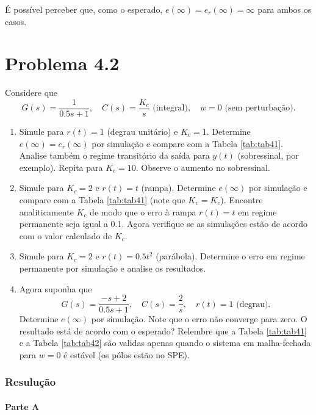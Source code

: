 \documentclass[
]{book}
\providecommand{\tightlist}{%
  \setlength{\itemsep}{0pt}\setlength{\parskip}{0pt}}
\theoremstyle{definition}
\theoremstyle{definition}
\theoremstyle{definition}
\theoremstyle{remark}
\begin{document}
É possível perceber que, como o esperado, \(e(\infty)= e_r(\infty) = \infty\) para ambos os casos.

\hypertarget{problema-4.2}{%
\section*{Problema 4.2}\label{problema-4.2}}

Considere que
\[
G(s) = \frac {1}{0.5s+1}, \quad C(s) = \frac{K_c}{s} \text{ (integral)}, \quad w=0 \text{ (sem perturbação).}
\]

\begin{enumerate}
\def\labelenumi{\alph{enumi}.}
\tightlist
\item
  Simule para \(r(t) = 1\) (degrau unitário) e \(K_c = 1\). Determine \(e(\infty) = e_r(\infty)\) por simulação e compare com a Tabela \ref{tab:tab41}. Analise também o regime transitório da saída para \(y(t)\) (sobressinal, por exemplo). Repita para \(K_c = 10\). Observe o aumento no sobressinal.
\item
  Simule para \(K_c = 2\) e \(r(t) = t\) (rampa). Determine \(e(\infty)\) por simulação e compare com a Tabela \ref{tab:tab41} (note que \(K_v = K_c\)). Encontre analiticamente \(K_c\) de modo que o erro à rampa \(r(t) = t\) em regime permanente seja igual a 0.1. Agora verifique se as simulações estão de acordo com o valor calculado de \(K_c\).
\item
  Simule para \(K_c = 2\) e \(r(t) = 0.5t^2\) (parábola). Determine o erro em regime permanente por simulação e analise os resultados.
\item
  Agora suponha que
  \[
  G(s) = \frac {-s+2}{0.5s+1}, \quad C(s)= \frac{2}{s}, \quad r(t) = 1 \text{ (degrau).}
  \]
  Determine \(e(\infty)\) por simulação. Note que o erro não converge para zero. O resultado está de acordo com o esperado? Relembre que a Tabela \ref{tab:tab41} e a Tabela \ref{tab:tab42} são validas apenas quando o sistema em malha-fechada para \(w=0\) é estável (os pólos estão no SPE).
\end{enumerate}

\hypertarget{resuluuxe7uxe3o}{%
\subsubsection*{Resulução}\label{resuluuxe7uxe3o}}

\hypertarget{parte-a-1}{%
\paragraph*{Parte A}\label{parte-a-1}}
\end{document}
